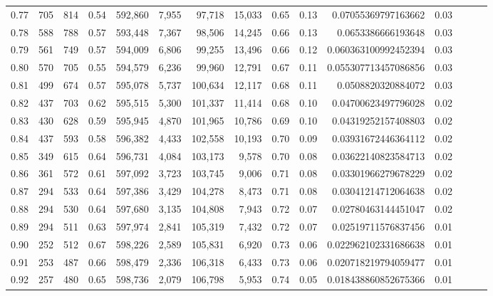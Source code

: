 \begin{tabular}{rrrrrrrrrrrrrrr}
0.77 &     705 &    814 &  0.54 &  592,860 &    7,955 &   97,718 &   15,033 &  0.65 &  0.13 &   0.07055369797163662 &      0.03 \\
0.78 &     588 &    788 &  0.57 &  593,448 &    7,367 &   98,506 &   14,245 &  0.66 &  0.13 &    0.0653386666193648 &      0.03 \\
0.79 &     561 &    749 &  0.57 &  594,009 &    6,806 &   99,255 &   13,496 &  0.66 &  0.12 &  0.060363100992452394 &      0.03 \\
0.80 &     570 &    705 &  0.55 &  594,579 &    6,236 &   99,960 &   12,791 &  0.67 &  0.11 &  0.055307713457086856 &      0.03 \\
0.81 &     499 &    674 &  0.57 &  595,078 &    5,737 &  100,634 &   12,117 &  0.68 &  0.11 &    0.0508820320884072 &      0.03 \\
0.82 &     437 &    703 &  0.62 &  595,515 &    5,300 &  101,337 &   11,414 &  0.68 &  0.10 &   0.04700623497796028 &      0.02 \\
0.83 &     430 &    628 &  0.59 &  595,945 &    4,870 &  101,965 &   10,786 &  0.69 &  0.10 &   0.04319252157408803 &      0.02 \\
0.84 &     437 &    593 &  0.58 &  596,382 &    4,433 &  102,558 &   10,193 &  0.70 &  0.09 &   0.03931672446364112 &      0.02 \\
0.85 &     349 &    615 &  0.64 &  596,731 &    4,084 &  103,173 &    9,578 &  0.70 &  0.08 &   0.03622140823584713 &      0.02 \\
0.86 &     361 &    572 &  0.61 &  597,092 &    3,723 &  103,745 &    9,006 &  0.71 &  0.08 &   0.03301966279678229 &      0.02 \\
0.87 &     294 &    533 &  0.64 &  597,386 &    3,429 &  104,278 &    8,473 &  0.71 &  0.08 &   0.03041214712064638 &      0.02 \\
0.88 &     294 &    530 &  0.64 &  597,680 &    3,135 &  104,808 &    7,943 &  0.72 &  0.07 &   0.02780463144451047 &      0.02 \\
0.89 &     294 &    511 &  0.63 &  597,974 &    2,841 &  105,319 &    7,432 &  0.72 &  0.07 &   0.02519711576837456 &      0.01 \\
0.90 &     252 &    512 &  0.67 &  598,226 &    2,589 &  105,831 &    6,920 &  0.73 &  0.06 &  0.022962102331686638 &      0.01 \\
0.91 &     253 &    487 &  0.66 &  598,479 &    2,336 &  106,318 &    6,433 &  0.73 &  0.06 &  0.020718219794059477 &      0.01 \\
0.92 &     257 &    480 &  0.65 &  598,736 &    2,079 &  106,798 &    5,953 &  0.74 &  0.05 &  0.018438860852675366 &      0.01 \\

\end{tabular}
